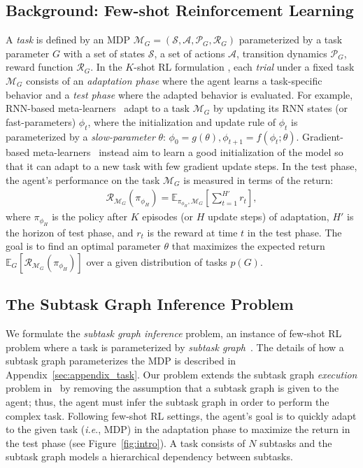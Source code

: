 \documentclass{article} \usepackage{iclr2020_conference,times}
\makeatletter
\newcommand{\mc}{\mathcal}
\DeclareRobustCommand\onedot{\futurelet\@let@token\@onedot}
\def\onedot{.}
\def\ie{\emph{i.e}\onedot} \def\Ie{\emph{I.e}\onedot}
\makeatother
\begin{document}
\subsection{Background: Few-shot Reinforcement Learning}
\label{sec:metarl}
A \emph{task} is defined by an MDP $\mc{M}_{G}=(\mc{S, A}, \mc{P}_{G}, \mc{R}_{G})$ parameterized by a task parameter $G$ with a set of states $\mc{S}$, a set of actions $\mc{A}$, transition dynamics $\mc{P}_{G}$, reward function $\mc{R}_{G}$.
In the $K$-shot RL formulation \citep{duan2016rl,finn2017model},
each \emph{trial} under a fixed task $\mc{M}_G$ consists of
an \emph{adaptation phase} where the agent learns a task-specific behavior
and a \emph{test phase} where the adapted behavior is evaluated. For example, RNN-based meta-learners~\citep{duan2016rl,wang2016learning}
adapt to a task $\mathcal M_G$ by updating its RNN states (or fast-parameters) $\phi_t$,
where the initialization and update rule of $\phi_t$ is parameterized by a \emph{slow-parameter} $\theta$:
$\phi_0 = g(\theta), \phi_{t+1} = f(\phi_t; \theta).
$ Gradient-based meta-learners~\citep{finn2017model,nichol2018first} instead
aim to learn a good initialization of the model so that it can adapt to a new task with few gradient update steps.
In the test phase, the agent's performance on the task $\mc{M}_G$ is measured in terms of the return:
\begin{align}
    \mc{R}_{\mc{M}_{G}}(\pi_{\phi_H}) = \mathbb{E}_{\pi_{\phi_H}, \mc{M}_{G} }\left[\textstyle\sum^{H'}_{t=1}{r_t}\right],\label{eq:loss}
\end{align}
where $\pi_{\phi_{H}}$ is the policy after $K$ episodes (or $H$ update steps) of adaptation, $H'$ is the horizon of test phase,
and $r_t$ is the reward at time $t$ in the test phase.
The goal is to find an optimal parameter $\theta$ that maximizes the expected return $\mathbb E_{G} [ \mc{R}_{\mc{M}_{G}}(\pi_{\phi_H}) ]$
over a given distribution of tasks $p(G)$.


\subsection{The Subtask Graph Inference Problem}\label{sec:sgi-problem}

We formulate the \emph{subtask graph inference} problem, an instance of few-shot RL problem where a task is parameterized by \emph{subtask graph}~\citep{sohn2018hierarchical}. 
The details of how a subtask graph parameterizes the MDP is described in Appendix~\ref{sec:appendix_task}.
Our problem extends the subtask graph \emph{execution} problem in~\citep{sohn2018hierarchical} by removing the assumption that a subtask graph is given to the agent; 
thus, the agent must infer the subtask graph in order to perform the complex task.
Following few-shot RL settings, 
the agent's goal is to quickly adapt to the given task (\ie, MDP) in the adaptation phase
to maximize the return in the test phase (see Figure~\ref{fig:intro}).
A task consists of $N$ subtasks and the subtask graph models a hierarchical dependency between subtasks.
\end{document}
